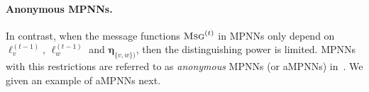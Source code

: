 \paragraph{Anonymous MPNNs.} In contrast, when the message functions 
$\textsc{Msg}^{(t)}$ in MPNNs only depend on $\pmb{\ell}_v^{(t-1)}$, $\pmb{\ell}_w^{(t-1)}$ and $\pmb{\eta}_{\{v,w\})}$, then the distinguishing power is limited. MPNNs with this restrictions are referred to as \textit{anonymous} MPNNs (or aMPNNs) in~\cite{Loukas2019}. We given an example of aMPNNs next.



